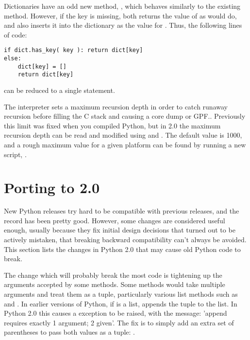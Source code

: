 \documentclass{howto}
\begin{document}
Dictionaries have an odd new method, , which behaves similarly to the existing
 method.  However, if the key is missing,
 both returns the value of  as
 would do, and also inserts it into the dictionary as
the value for .  Thus, the following lines of code:

\begin{verbatim}
if dict.has_key( key ): return dict[key]
else: 
    dict[key] = []
    return dict[key]
\end{verbatim}

can be reduced to a single  statement.

The interpreter sets a maximum recursion depth in order to catch
runaway recursion before filling the C stack and causing a core dump
or GPF..  Previously this limit was fixed when you compiled Python,
but in 2.0 the maximum recursion depth can be read and modified using
 and .
The default value is 1000, and a rough maximum value for a given
platform can be found by running a new script,
.

\section{Porting to 2.0}

New Python releases try hard to be compatible with previous releases,
and the record has been pretty good.  However, some changes are
considered useful enough, usually because they fix initial design decisions that
turned out to be actively mistaken, that breaking backward compatibility
can't always be avoided.  This section lists the changes in Python 2.0
that may cause old Python code to break.

The change which will probably break the most code is tightening up
the arguments accepted by some methods.  Some methods would take
multiple arguments and treat them as a tuple, particularly various
list methods such as  and .
In earlier versions of Python, if  is a list,  appends the tuple  to the list.  In Python 2.0 this
causes a  exception to be raised, with the
message: 'append requires exactly 1 argument; 2 given'.  The fix is to
simply add an extra set of parentheses to pass both values as a tuple: 
.
\end{document}
